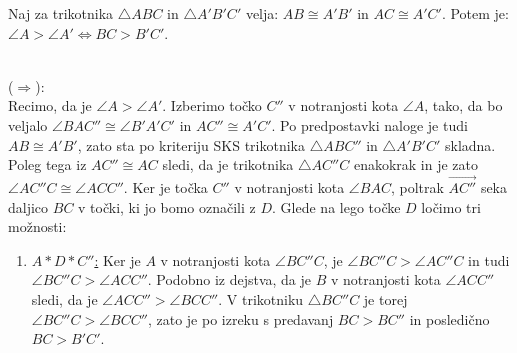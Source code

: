     \begin{trditev}[I.24, I.25]
        Naj za trikotnika $\triangle ABC$ in $\triangle A'B'C'$ velja: $AB\cong A'B'$ in $AC\cong A'C'$.
        Potem je: $\angle A > \angle A' \Leftrightarrow BC > B'C'$.
    \end{trditev}

        \begin{dokaz}
            \\ ($\Rightarrow$):
            \\ Recimo, da je $\angle A > \angle A'$. Izberimo točko $C''$ v notranjosti kota $\angle A$, tako, da bo veljalo $\angle BAC'' \cong \angle B'A'C'$ in $AC''\cong A'C'$. Po predpostavki naloge je tudi $AB\cong A'B'$, zato sta po kriteriju SKS trikotnika $\triangle ABC''$ in $\triangle A'B'C'$ skladna. Poleg tega iz $AC''\cong AC$ sledi, da je trikotnika $\triangle AC''C$ enakokrak in je zato $\angle AC''C\cong \angle ACC''$.
            Ker je točka $C''$ v notranjosti kota $\angle BAC$, poltrak $\overrightarrow{AC''}$ seka daljico $BC$ v točki, ki jo bomo označili z $D$. Glede na lego točke $D$ ločimo tri možnosti: \begin{enumerate}
                \item \uline{$A\ast D\ast C''$:} Ker je $A$ v notranjosti kota $\angle BC''C$, je $\angle BC''C>\angle AC''C$ in tudi $\angle BC''C > \angle ACC''$. Podobno iz dejstva, da je $B$ v notranjosti kota $\angle ACC''$ sledi, da je $\angle ACC'' > \angle BCC''$. V trikotniku $\triangle BC''C$ je torej $\angle BC''C>\angle BCC''$, zato je po izreku s predavanj $BC>BC''$ in posledično $BC>B'C'$. 
                \\ 
\end{enumerate}
\end{dokaz}
